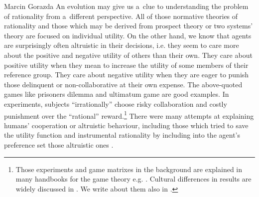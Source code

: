 \begin{artengenv}{Marcin Gorazda}
An evolution may give us a~clue to understanding the problem of rationality from a~different perspective. All of those normative theories of rationality and those which may be derived from prospect theory or two systems' theory are focused on individual utility. On the other hand, we know that agents are surprisingly often altruistic in their decisions, i.e. they seem to care more about the positive and negative utility of others than their own. They care about positive utility when they mean to increase the utility of some members of their reference group. They care about negative utility when they are eager to punish those delinquent or non-collaborative at their own expense. The above-quoted games like prisoners dilemma and ultimatum game are good examples. In experiments, subjects ``irrationally'' choose risky collaboration and costly punishment over the ``rational'' reward.\footnote{Those experiments and game matrixes in the background are explained in many handbooks for the game theory e.g.
\parencite[][]{straffin_game_2002}. %
 Cultural differences in results are widely discussed in 
\parencites[][]{henrich_search_2001}[][]{henrich_weirdest_2020}. %
 We write about them also in 
\parencite[][]{gorazda_miedzy_2020}.%
} There were many attempts at explaining humans' cooperation or altruistic behaviour, including those which tried to save the utility function and instrumental rationality by including into the agent's preference set those altruistic ones 
\parencite[][]{becker_treatise_1981}. %

\end{artengenv}

